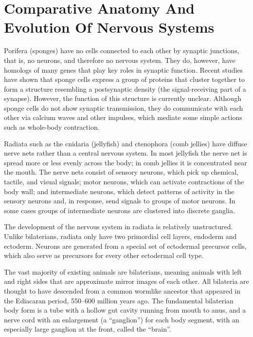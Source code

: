 \documentclass[]{book}
\begin{document}
\hypertarget{comparative-anatomy-and-evolution-of-nervous-systems}{%
\section{Comparative Anatomy And Evolution Of Nervous Systems}\label{comparative-anatomy-and-evolution-of-nervous-systems}}

Porifera (sponges) have no cells connected to each other by synaptic junctions, that is, no neurons, and therefore no nervous system. They do, however, have homologs of many genes that play key roles in synaptic function. Recent studies have shown that sponge cells express a group of proteins that cluster together to form a structure resembling a postsynaptic density (the signal-receiving part of a synapse). However, the function of this structure is currently unclear. Although sponge cells do not show synaptic transmission, they do communicate with each other via calcium waves and other impulses, which mediate some simple actions such as whole-body contraction.

Radiata such as the cnidaria (jellyfish) and ctenophora (comb jellies) have diffuse nerve nets rather than a central nervous system. In most jellyfish the nerve net is spread more or less evenly across the body; in comb jellies it is concentrated near the mouth. The nerve nets consist of sensory neurons, which pick up chemical, tactile, and visual signals; motor neurons, which can activate contractions of the body wall; and intermediate neurons, which detect patterns of activity in the sensory neurons and, in response, send signals to groups of motor neurons. In some cases groups of intermediate neurons are clustered into discrete ganglia.

The development of the nervous system in radiata is relatively unstructured. Unlike bilaterians, radiata only have two primordial cell layers, endoderm and ectoderm. Neurons are generated from a special set of ectodermal precursor cells, which also serve as precursors for every other ectodermal cell type.

The vast majority of existing animals are bilaterians, meaning animals with left and right sides that are approximate mirror images of each other. All bilateria are thought to have descended from a common wormlike ancestor that appeared in the Ediacaran period, 550--600 million years ago. The fundamental bilaterian body form is a tube with a hollow gut cavity running from mouth to anus, and a nerve cord with an enlargement (a ``ganglion'') for each body segment, with an especially large ganglion at the front, called the ``brain''.
\end{document}
